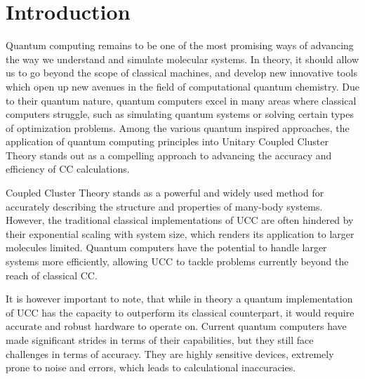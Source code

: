 \documentclass[twoside,twocolumn,9pt]{article}
\begin{document}






\section{Introduction}
Quantum computing remains to be one of the most promising ways of advancing the way we understand and simulate molecular systems. In theory, it should allow us to go beyond the scope of classical machines, and develop new innovative tools which open up new avenues in the field of computational quantum chemistry. Due to their quantum nature, quantum computers excel in many areas where classical computers struggle, such as simulating quantum systems or solving certain types of optimization problems. Among the various quantum inspired approaches, the application of quantum computing principles into Unitary Coupled Cluster Theory stands out as a compelling approach to advancing the accuracy and efficiency of CC calculations.

Coupled Cluster Theory stands as a powerful and widely used method for accurately describing the structure and properties of many-body systems. However, the traditional classical implementations of UCC are often hindered by their exponential scaling with system size, which renders its application to larger molecules limited. Quantum computers have the potential to handle larger systems more efficiently, allowing UCC to tackle problems currently beyond the reach of classical CC.

It is however important to note, that while in theory a quantum implementation of UCC has the capacity to outperform its classical counterpart, it would require accurate and robust hardware to operate on. Current quantum computers have made significant strides in terms of their capabilities, but they still face challenges in terms of accuracy. They are highly sensitive devices, extremely prone to noise and errors, which leads to calculational inaccuracies.
\end{document}

